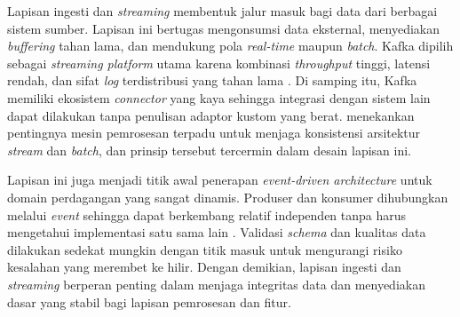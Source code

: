 Lapisan ingesti dan \textit{streaming} membentuk jalur masuk bagi data dari berbagai sistem sumber. Lapisan ini bertugas mengonsumsi data eksternal, menyediakan \textit{buffering} tahan lama, dan mendukung pola \textit{real-time} maupun \textit{batch}. Kafka dipilih sebagai \textit{streaming platform} utama karena kombinasi \textit{throughput} tinggi, latensi rendah, dan sifat \textit{log} terdistribusi yang tahan lama \autocite{apachekafka2024}. Di samping itu, Kafka memiliki ekosistem \textit{connector} yang kaya sehingga integrasi dengan sistem lain dapat dilakukan tanpa penulisan adaptor kustom yang berat. \textcite{carbone2015apache} menekankan pentingnya mesin pemrosesan terpadu untuk menjaga konsistensi arsitektur \textit{stream} dan \textit{batch}, dan prinsip tersebut tercermin dalam desain lapisan ini.

Lapisan ini juga menjadi titik awal penerapan \textit{event-driven architecture} untuk domain perdagangan yang sangat dinamis. Produser dan konsumer dihubungkan melalui \textit{event} sehingga dapat berkembang relatif independen tanpa harus mengetahui implementasi satu sama lain \autocite{aws2024edapatterns,stopford2018designing}. Validasi \textit{schema} dan kualitas data dilakukan sedekat mungkin dengan titik masuk untuk mengurangi risiko kesalahan yang merembet ke hilir. Dengan demikian, lapisan ingesti dan \textit{streaming} berperan penting dalam menjaga integritas data dan menyediakan dasar yang stabil bagi lapisan pemrosesan dan fitur.

